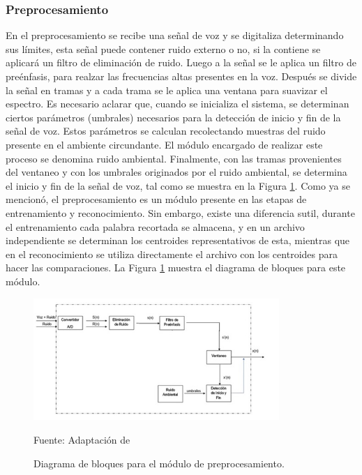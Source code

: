 \subsubsection{Preprocesamiento}
En el preprocesamiento se recibe una señal de voz y se digitaliza determinando sus límites, esta señal puede contener ruido externo o no, si la contiene se aplicará un filtro de eliminación de ruido. Luego a la señal se le aplica un filtro de preénfasis, para realzar las frecuencias altas presentes en la voz. Después se divide la señal en tramas y a cada trama se le aplica una ventana para suavizar el espectro. 
\vskip 0.5cm
Es necesario aclarar que, cuando se inicializa el sistema, se determinan ciertos parámetros (umbrales) necesarios para la detección de inicio y fin de la señal de voz. Estos parámetros se calculan recolectando muestras del ruido presente en el ambiente circundante. El módulo encargado de realizar este proceso se denomina ruido ambiental. Finalmente, con las tramas provenientes del ventaneo y con los umbrales originados por el ruido ambiental, se determina el inicio y fin de la señal de voz, tal como se muestra en la Figura \ref{fig:figura2.7}.
\vskip 0.5cm
Como ya se mencionó, el preprocesamiento es un módulo presente en las etapas de entrenamiento y reconocimiento. Sin embargo, existe una diferencia sutil, durante el entrenamiento cada palabra recortada se almacena, y en un archivo independiente se determinan los centroides representativos de esta, mientras que en el reconocimiento se utiliza directamente el archivo con los centroides para hacer las comparaciones. La Figura \ref{fig:figura2.7} muestra el diagrama de bloques para este módulo.

\begin{figure}[ht]
\begin{center}
\includegraphics[width=0.83\textwidth]{Imagenes/Cap2/image007}
\end{center}
\begin{center}
\vskip -0.5cm
\caption{\small{Diagrama de bloques para el módulo de preprocesamiento.}}
\label{fig:figura2.7}
{\small{Fuente: Adaptación de \cite{navarrete}}}
\end{center}
\end{figure}

